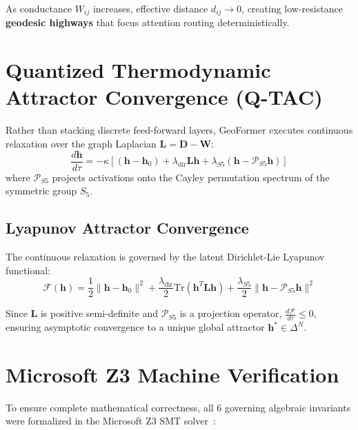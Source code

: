 \documentclass[11pt,a4paper]{article}
\begin{document}
As conductance $W_{ij}$ increases, effective distance $d_{ij} \to 0$, creating low-resistance \textbf{geodesic highways} that focus attention routing deterministically.

\section{Quantized Thermodynamic Attractor Convergence (Q-TAC)}

Rather than stacking discrete feed-forward layers, GeoFormer executes continuous relaxation over the graph Laplacian $\mathbf{L} = \mathbf{D} - \mathbf{W}$:
\begin{equation}
\frac{d\mathbf{h}}{d\tau} = -\kappa \left[ (\mathbf{h} - \mathbf{h}_0) + \lambda_{\text{dir}} \mathbf{L} \mathbf{h} + \lambda_{S5} (\mathbf{h} - \mathcal{P}_{S5}\mathbf{h}) \right]
\end{equation}
where $\mathcal{P}_{S5}$ projects activations onto the Cayley permutation spectrum of the symmetric group $S_5$.

\subsection{Lyapunov Attractor Convergence}
The continuous relaxation is governed by the latent Dirichlet-Lie Lyapunov functional:
\begin{equation}
\mathcal{F}(\mathbf{h}) = \frac{1}{2} \|\mathbf{h} - \mathbf{h}_0\|^2 + \frac{\lambda_{\text{dir}}}{2} \text{Tr}(\mathbf{h}^T \mathbf{L} \mathbf{h}) + \frac{\lambda_{S5}}{2} \|\mathbf{h} - \mathcal{P}_{S5}\mathbf{h}\|^2
\end{equation}

Since $\mathbf{L}$ is positive semi-definite and $\mathcal{P}_{S5}$ is a projection operator, $\frac{d\mathcal{F}}{d\tau} \le 0$, ensuring asymptotic convergence to a unique global attractor $\mathbf{h}^* \in \Delta^N$.

\section{Microsoft Z3 Machine Verification}

To ensure complete mathematical correctness, all 6 governing algebraic invariants were formalized in the Microsoft Z3 SMT solver~\cite{demoura2008z3}:
\end{document}
